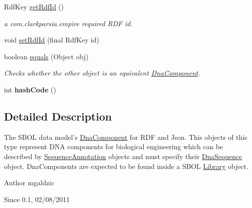 \begin{DoxyCompactItemize}
RdfKey \hyperlink{classorg_1_1sbolstandard_1_1lib_s_b_o_lj_1_1_dna_component_a98d34c30847c78a8922be878a2fa4d49}{getRdfId} ()
\begin{DoxyCompactList}\small\item\em a com.clarkparsia.empire required RDF id. \item\end{DoxyCompactList}\item 
void \hyperlink{classorg_1_1sbolstandard_1_1lib_s_b_o_lj_1_1_dna_component_afe8d2a1ced8871ba217ddf364366da99}{setRdfId} (final RdfKey id)
\item 
boolean \hyperlink{classorg_1_1sbolstandard_1_1lib_s_b_o_lj_1_1_dna_component_ae3ce8ca5a04e8966a9d2158aeeecfc16}{equals} (Object obj)
\begin{DoxyCompactList}\small\item\em Checks whether the other object is an equivalent \hyperlink{classorg_1_1sbolstandard_1_1lib_s_b_o_lj_1_1_dna_component}{DnaComponent}. \item\end{DoxyCompactList}\item 
\hypertarget{classorg_1_1sbolstandard_1_1lib_s_b_o_lj_1_1_dna_component_a077e18fe97323c7194e2665ffc766399}{
int {\bfseries hashCode} ()}
\label{classorg_1_1sbolstandard_1_1lib_s_b_o_lj_1_1_dna_component_a077e18fe97323c7194e2665ffc766399}

\end{DoxyCompactItemize}


\subsection{Detailed Description}
The SBOL data model's \hyperlink{classorg_1_1sbolstandard_1_1lib_s_b_o_lj_1_1_dna_component}{DnaComponent} for RDF and Json. This objects of this type represent DNA components for biological engineering which can be described by \hyperlink{classorg_1_1sbolstandard_1_1lib_s_b_o_lj_1_1_sequence_annotation}{SequenceAnnotation} objects and must specify their \hyperlink{classorg_1_1sbolstandard_1_1lib_s_b_o_lj_1_1_dna_sequence}{DnaSequence} object. DnaComponents are expected to be found inside a SBOL \hyperlink{classorg_1_1sbolstandard_1_1lib_s_b_o_lj_1_1_library}{Library} object.

\begin{DoxyAuthor}{Author}
mgaldzic 
\end{DoxyAuthor}
\begin{DoxySince}{Since}
0.1, 02/08/2011 
\end{DoxySince}



